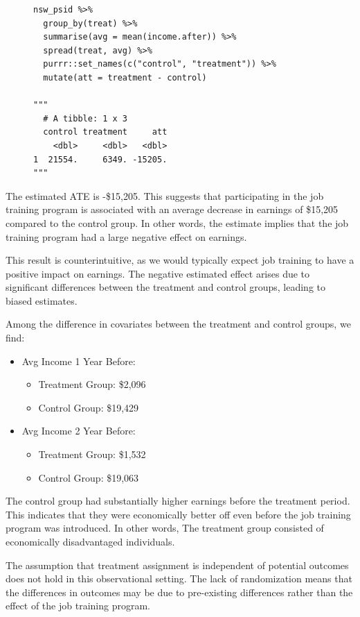 \documentclass{article}
\begin{document}
\begin{figure}[H]
\centering
\begin{lstlisting}[style=Rstyle, caption=ATT for Observational Data]
nsw_psid %>% 
  group_by(treat) %>% 
  summarise(avg = mean(income.after)) %>% 
  spread(treat, avg) %>% 
  purrr::set_names(c("control", "treatment")) %>% 
  mutate(att = treatment - control)

"""
  # A tibble: 1 x 3
  control treatment     att
    <dbl>     <dbl>   <dbl>
1  21554.     6349. -15205.
"""
\end{lstlisting}
\end{figure}

The estimated ATE is -\$15,205. This suggests that participating in the job training program is associated with an average decrease in earnings of \$15,205 compared to the control group. In other words, the estimate implies that the job training program had a large negative effect on earnings.

This result is counterintuitive, as we would typically expect job training to have a positive impact on earnings. The negative estimated effect arises due to significant differences between the treatment and control groups, leading to biased estimates. 

Among the difference in covariates between the treatment and control groups, we find:
\begin{itemize}
    \item Avg Income 1 Year Before:
    \begin{itemize}
        \item Treatment Group: \$2,096
        \item Control Group: \$19,429
    \end{itemize}
    \item Avg Income 2 Year Before:
    \begin{itemize}
        \item Treatment Group: \$1,532
        \item Control Group: \$19,063
    \end{itemize}
\end{itemize}

The control group had substantially higher earnings before the treatment period. This indicates that they were economically better off even before the job training program was introduced. In other words, The treatment group consisted of economically disadvantaged individuals.

The assumption that treatment assignment is independent of potential outcomes does not hold in this observational setting. The lack of randomization means that the differences in outcomes may be due to pre-existing differences rather than the effect of the job training program.
\end{document}
